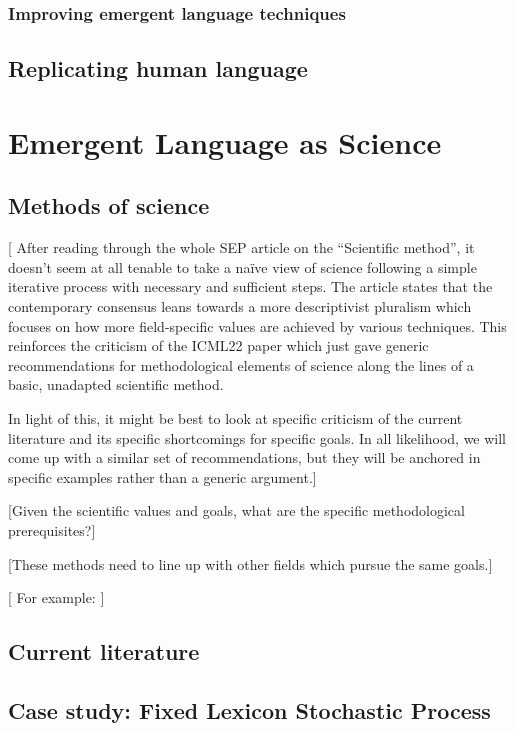 \documentclass[letterpaper]{report}
\newcommand\bjb[1]{{\color{blue}[#1]}}
\newcommand\cmg[1]{{\color{gray}[#1]}}
\begin{document}
\subsection{Improving emergent language techniques}
\section{Replicating human language}

\chapter{Emergent Language as Science}
\section{Methods of science}
\bjb{%
    After reading through the whole SEP article on the ``Scientific method'', it doesn't seem at all tenable to take a na\"ive view of science following a simple iterative process with necessary and sufficient steps.
    The article states that the contemporary consensus leans towards a more descriptivist pluralism which focuses on how more field-specific values are achieved by various techniques.
    This reinforces the criticism of the ICML22 paper which just gave generic recommendations for methodological elements of science along the lines of a basic, unadapted scientific method.
    
    In light of this, it might be best to look at specific criticism of the current literature and its specific shortcomings for specific goals.
    In all likelihood, we will come up with a similar set of recommendations, but they will be anchored in specific examples rather than a generic argument.}

\cmg{Given the scientific values and goals, what are the specific methodological prerequisites?}

\cmg{These methods need to line up with other fields which pursue the same goals.}

\cmg{%
    For example:
}


\section{Current literature}
\section{Case study: Fixed Lexicon Stochastic Process}
\end{document}
